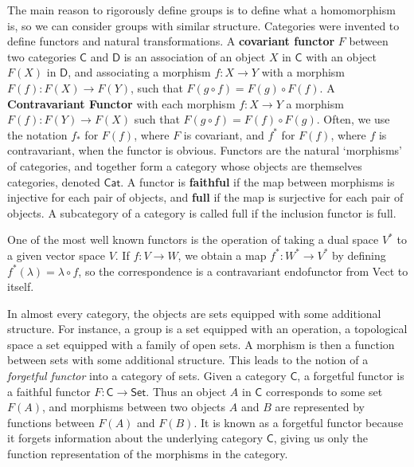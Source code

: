 The main reason to rigorously define groups is to define what a homomorphism is, so we can consider groups with similar structure. Categories were invented to define functors and natural transformations. A {\bf covariant functor} $F$ between two categories $\mathsf{C}$ and $\mathsf{D}$ is an association of an object $X$ in $\mathsf{C}$ with an object $F(X)$ in $\mathsf{D}$, and associating a morphism $f: X \to Y$ with a morphism $F(f): F(X) \to F(Y)$, such that $F(g \circ f) = F(g) \circ F(f)$. A {\bf Contravariant Functor} with each morphism $f: X \to Y$ a morphism $F(f): F(Y) \to F(X)$ such that $F(g \circ f) = F(f) \circ F(g)$. Often, we use the notation $f_*$ for $F(f)$, where $F$ is covariant, and $f^*$ for $F(f)$, where $f$ is contravariant, when the functor is obvious. Functors are the natural `morphisms' of categories, and together form a category whose objects are themselves categories, denoted $\mathsf{Cat}$. A functor is {\bf faithful} if the map between morphisms is injective for each pair of objects, and {\bf full} if the map is surjective for each pair of objects. A subcategory of a category is called full if the inclusion functor is full.

\begin{example}
    One of the most well known functors is the operation of taking a dual space $V^*$ to a given vector space $V$. If $f: V \to W$, we obtain a map $f^*: W^* \to V^*$ by defining $f^*(\lambda) = \lambda \circ f$, so the correspondence is a contravariant endofunctor from {\sf Vect} to itself.
\end{example}

\begin{example}
    In almost every category, the objects are sets equipped with some additional structure. For instance, a group is a set equipped with an operation, a topological space a set equipped with a family of open sets. A morphism is then a function between sets with some additional structure. This leads to the notion of a {\it forgetful functor} into a category of sets. Given a category $\mathsf{C}$, a forgetful functor is a faithful functor $F: \mathsf{C} \to \textsf{Set}$. Thus an object $A$ in $\mathsf{C}$ corresponds to some set $F(A)$, and morphisms between two objects $A$ and $B$ are represented by functions between $F(A)$ and $F(B)$. It is known as a forgetful functor because it forgets information about the underlying category $\mathsf{C}$, giving us only the function representation of the morphisms in the category.
\end{example}

